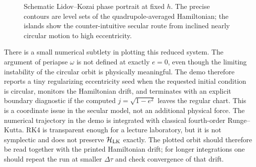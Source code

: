\begin{figure}[htbp]
\centering
{}
\caption{Schematic Lidov--Kozai phase portrait at fixed \(h\).  The precise
contours are level sets of the quadrupole-averaged Hamiltonian; the islands
show the counter-intuitive secular route from inclined nearly circular motion
to high eccentricity.}
\label{fig:lidov-kozai-phase-portrait}
\end{figure}

There is a small numerical subtlety in plotting this reduced system.  The
argument of periapse \(\omega\) is not defined at exactly \(e=0\), even though
the limiting instability of the circular orbit is physically meaningful.  The
demo therefore reports a tiny regularizing eccentricity seed when the requested
initial condition is circular, monitors the Hamiltonian drift, and terminates
with an explicit boundary diagnostic if the computed \(j=\sqrt{1-e^2}\) leaves
the regular chart.  This is a coordinate issue in the secular model, not an
additional physical force.  The numerical trajectory in the demo is integrated
with classical fourth-order Runge--Kutta.  RK4 is transparent enough for a
lecture laboratory, but it is not symplectic and does not preserve
\(\mathcal H_{\rm LK}\) exactly.  The plotted orbit should therefore be read
together with the printed Hamiltonian drift; for longer integrations one should
repeat the run at smaller \(\Delta \tau\) and check convergence of that drift.

